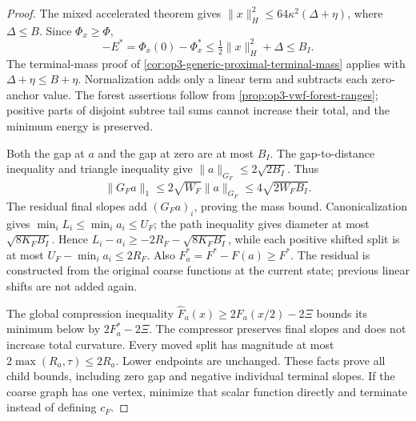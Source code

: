 \begin{proof}
The mixed accelerated theorem gives
$\|x\|_H^2\leq64\kappa^2(\Delta+\eta)$, where
$\Delta\leq B$. Since $\Phi_x\geq\Phi$,
\[
 -E^*=\Phi_x(0)-\Phi_x^*
 \leq\tfrac12\|x\|_H^2+\Delta\leq B_I.
\]
The terminal-mass proof of
\cref{cor:op3-generic-proximal-terminal-mass} applies with
$\Delta+\eta\leq B+\eta$. Normalization adds only a linear term and
subtracts each zero-anchor value. The forest assertions follow from
\cref{prop:op3-vwf-forest-ranges}; positive parts of disjoint subtree
tail sums cannot increase their total, and the minimum energy is preserved.

Both the gap at $a$ and the gap at zero are at most $B_I$. The
gap-to-distance inequality and triangle inequality give
$\|a\|_{G_F}\leq2\sqrt{2B_I}$. Thus
\[
 \|G_Fa\|_1\leq2\sqrt{W_F}\|a\|_{G_F}
 \leq4\sqrt{2W_FB_I}.
\]
The residual final slopes add $(G_Fa)_i$, proving the mass bound.
Canonicalization gives $\min_iL_i\leq\min_i a_i\leq U_F$;
the path inequality gives diameter at most $\sqrt{8K_FB_I}$.
Hence $L_i-a_i\geq-2R_F-\sqrt{8K_FB_I}$, while each positive
shifted split is at most $U_F-\min_i a_i\leq2R_F$.
Also $F_a^*=F^*-F(a)\geq F^*$.
The residual is constructed from the original coarse functions at the
current state; previous linear shifts are not added again.

The global compression inequality
$\widehat F_a(x)\geq2F_a(x/2)-2\Xi$ bounds its minimum below by
$2F_a^*-2\Xi$. The compressor preserves final slopes and does not
increase total curvature. Every moved split has magnitude at most
$2\max(R_a,\tau)\leq2R_a$. Lower endpoints are unchanged. These
facts prove all child bounds, including zero gap and negative individual
terminal slopes. If the coarse graph has one vertex, minimize that
scalar function directly and terminate instead of defining $c_F$.
\end{proof}

